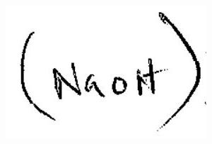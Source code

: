\documentclass[10pt]{article}
\begin{document}
\includegraphics[max width=\textwidth]{2022_11_11_ca6a6c1a0324ee23e523g-66}
\end{document}
